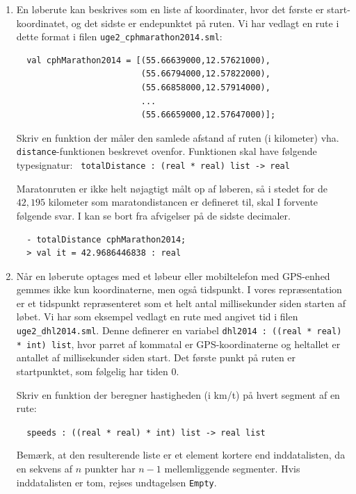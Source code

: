 \documentclass[a4paper,12pt]{article}
\begin{document}
\begin{enumerate}[{2}G1]
\item En løberute kan beskrives som en liste af koordinater, hvor det
  første er start-koordinatet, og det sidste er endepunktet på
  ruten.  Vi har vedlagt en rute i dette format i filen
  \texttt{uge2\_cphmarathon2014.sml}:
  \begin{verbatim}
  val cphMarathon2014 = [(55.66639000,12.57621000),
                         (55.66794000,12.57822000),
                         (55.66858000,12.57914000),
                         ...
                         (55.66659000,12.57647000)];\end{verbatim}
  Skriv en funktion der måler den samlede afstand af ruten (i
  kilometer) vha. \verb|distance|-funktionen beskrevet
  ovenfor. Funktionen skal have følgende typesignatur:
  \verb| totalDistance : (real * real) list -> real|

  Maratonruten er ikke helt nøjagtigt målt op af løberen, så i stedet
  for de $42,195$ kilometer som maratondistancen er defineret til, skal I
  forvente følgende svar. I kan se bort fra afvigelser på de sidste
  decimaler.
  \begin{verbatim}
  - totalDistance cphMarathon2014;
  > val it = 42.9686446838 : real
  \end{verbatim}
\item Når en løberute optages med et løbeur eller mobiltelefon med
  GPS-enhed gemmes ikke kun koordinaterne, men også tidspunkt.  I
  vores repræsentation er et tidspunkt repræsenteret som et helt antal
  millisekunder siden starten af løbet.  Vi har som eksempel vedlagt
  en rute med angivet tid i filen \verb|uge2_dhl2014.sml|.  Denne
  definerer en variabel \verb|dhl2014 : ((real * real) * int) list|,
  hvor parret af kommatal er GPS-koordinaterne og heltallet er
  antallet af millisekunder siden start.  Det første punkt på ruten er
  startpunktet, som følgelig har tiden 0.

  Skriv en funktion der beregner hastigheden (i km/t) på hvert segment
  af en rute:

  \verb|  speeds : ((real * real) * int) list -> real list|

  Bemærk, at den resulterende liste er et element kortere end
  inddatalisten, da en sekvens af $n$ punkter har $n-1$ mellemliggende
  segmenter.  Hvis inddatalisten er tom, rejses undtagelsen
  \verb|Empty|.


\end{enumerate}
\end{document}

